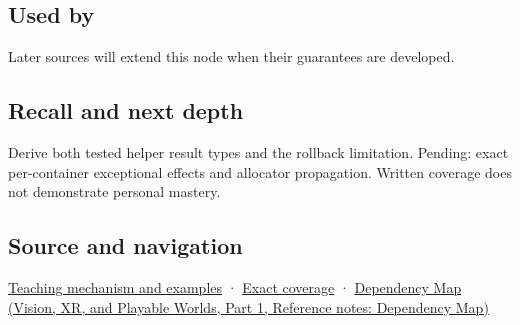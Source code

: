 \subsection{Used by}\label{appendix-c746afaa47d1-used-by}

\hypertarget{appendix-c746afaa47d1-used-by}{}

Later sources will extend this node when their guarantees are developed.

\subsection{Recall and next depth}\label{appendix-c746afaa47d1-recall-and-next-depth}

\hypertarget{appendix-c746afaa47d1-recall-and-next-depth}{}

Derive both tested helper result types and the rollback limitation. Pending: exact per-container exceptional effects and allocator propagation. Written coverage does not demonstrate personal mastery.

\subsection{Source and navigation}\label{appendix-c746afaa47d1-source-and-navigation}

\hypertarget{appendix-c746afaa47d1-source-and-navigation}{}

\hyperref[01-foundations-i-ch003-failure-guarantees-shape-the-transfer-algorithm]{Teaching mechanism and examples} · \hyperref[appendix-fd090d982a15-m009---parts-127-147]{Exact coverage} · \href{../07-Vision-XR-and-Playable-Worlds-P01/main.pdf\#appendix-4ad47bdd269a}{Dependency Map (Vision, XR, and Playable Worlds, Part 1, Reference notes: Dependency Map)}
